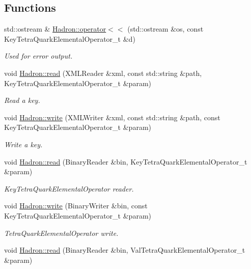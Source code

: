 \subsection*{Functions}
\begin{DoxyCompactItemize}
\item 
std\+::ostream \& \mbox{\hyperlink{namespaceHadron_a7065bb8b0e72a1c7d300230e08cdfdde}{Hadron\+::operator$<$$<$}} (std\+::ostream \&os, const Key\+Tetra\+Quark\+Elemental\+Operator\+\_\+t \&d)
\begin{DoxyCompactList}\small\item\em Used for error output. \end{DoxyCompactList}\item 
void \mbox{\hyperlink{namespaceHadron_ab1a8a0ffcdeeae3ff66ed453c1609de7}{Hadron\+::read}} (X\+M\+L\+Reader \&xml, const std\+::string \&path, Key\+Tetra\+Quark\+Elemental\+Operator\+\_\+t \&param)
\begin{DoxyCompactList}\small\item\em Read a key. \end{DoxyCompactList}\item 
void \mbox{\hyperlink{namespaceHadron_a4b91e53beed52be0c8431a4464285dfd}{Hadron\+::write}} (X\+M\+L\+Writer \&xml, const std\+::string \&path, const Key\+Tetra\+Quark\+Elemental\+Operator\+\_\+t \&param)
\begin{DoxyCompactList}\small\item\em Write a key. \end{DoxyCompactList}\item 
void \mbox{\hyperlink{namespaceHadron_a10d99bb52996f8aec8a87612e98d5684}{Hadron\+::read}} (Binary\+Reader \&bin, Key\+Tetra\+Quark\+Elemental\+Operator\+\_\+t \&param)
\begin{DoxyCompactList}\small\item\em Key\+Tetra\+Quark\+Elemental\+Operator reader. \end{DoxyCompactList}\item 
void \mbox{\hyperlink{namespaceHadron_a4fefcfe0419c7e64ff031011643eb810}{Hadron\+::write}} (Binary\+Writer \&bin, const Key\+Tetra\+Quark\+Elemental\+Operator\+\_\+t \&param)
\begin{DoxyCompactList}\small\item\em Tetra\+Quark\+Elemental\+Operator write. \end{DoxyCompactList}\item 
void \mbox{\hyperlink{namespaceHadron_a614faa9c1c7ae1880f009d5c9aa672ec}{Hadron\+::read}} (Binary\+Reader \&bin, Val\+Tetra\+Quark\+Elemental\+Operator\+\_\+t \&param)

\end{DoxyCompactItemize}
